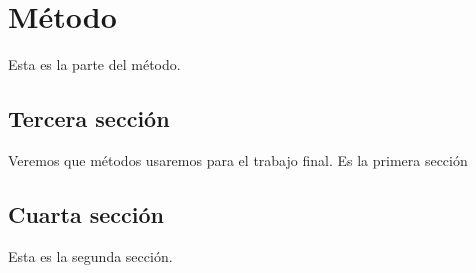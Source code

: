 \chapter{Método}
Esta es la parte del método.
\section{Tercera sección}
Veremos que métodos usaremos para el trabajo final.
Es la primera sección
\section{Cuarta sección}
Esta es la segunda sección.